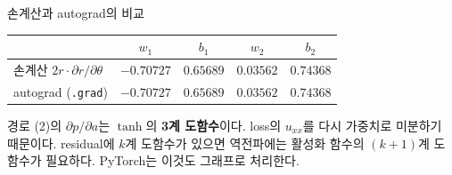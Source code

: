 \documentclass[aspectratio=169,11pt]{beamer}
\begin{document}
\begin{frame}{손계산과 autograd의 비교}
\begin{center}
\begin{tabular}{@{}lcccc@{}}
\toprule
& $w_1$ & $b_1$ & $w_2$ & $b_2$ \\
\midrule
손계산 $2r\cdot\partial r/\partial\theta$ & $-0.70727$ & $0.65689$ & $0.03562$ & $0.74368$ \\
autograd (\texttt{.grad}) & $-0.70727$ & $0.65689$ & $0.03562$ & $0.74368$ \\
\bottomrule
\end{tabular}
\end{center}
\vskip3mm
\begin{thinkbox}
경로 (2)의 $\partial p/\partial a$는 $\tanh$의 \textbf{3계 도함수}이다. loss의 $u_{xx}$를 다시 가중치로 미분하기 때문이다.
\vskip1mm
residual에 $k$계 도함수가 있으면 역전파에는 활성화 함수의 $(k+1)$계 도함수가 필요하다.
PyTorch는 이것도 그래프로 처리한다.
\end{thinkbox}
\end{frame}
\end{document}
